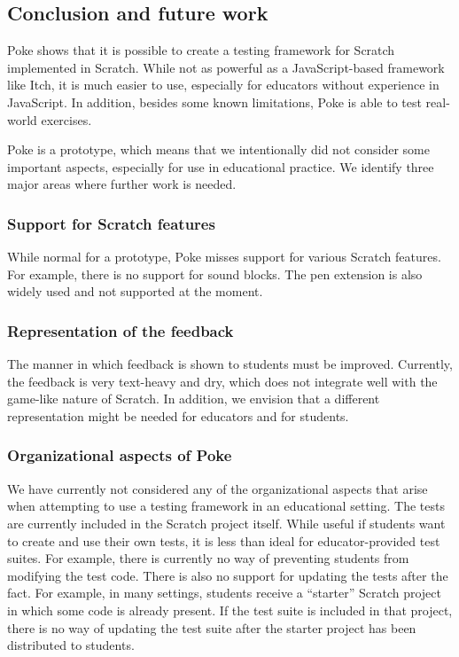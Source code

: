 \documentclass[../main]{subfiles}
\begin{document}
\subsection{Conclusion and future work}\label{subsec:conclusion-and-future-work}

Poke shows that it is possible to create a testing framework for Scratch implemented in Scratch.
While not as powerful as a JavaScript-based framework like Itch, it is much easier to use, especially for educators without experience in JavaScript.
In addition, besides some known limitations, Poke is able to test real-world exercises.

Poke is a prototype, which means that we intentionally did not consider some important aspects, especially for use in educational practice.
We identify three major areas where further work is needed.

\subsubsection{Support for Scratch features}
While normal for a prototype, Poke misses support for various Scratch features.
For example, there is no support for sound blocks.
The pen extension is also widely used and not supported at the moment.

\subsubsection{Representation of the feedback}
The manner in which feedback is shown to students must be improved.
Currently, the feedback is very text-heavy and dry, which does not integrate well with the game-like nature of Scratch.
In addition, we envision that a different representation might be needed for educators and for students.

\subsubsection{Organizational aspects of Poke}
We have currently not considered any of the organizational aspects that arise when attempting to use a testing framework in an educational setting.
The tests are currently included in the Scratch project itself.
While useful if students want to create and use their own tests, it is less than ideal for educator-provided test suites.
For example, there is currently no way of preventing students from modifying the test code.
There is also no support for updating the tests after the fact.
For example, in many settings, students receive a ``starter'' Scratch project in which some code is already present.
If the test suite is included in that project, there is no way of updating the test suite after the starter project has been distributed to students.
\end{document}
